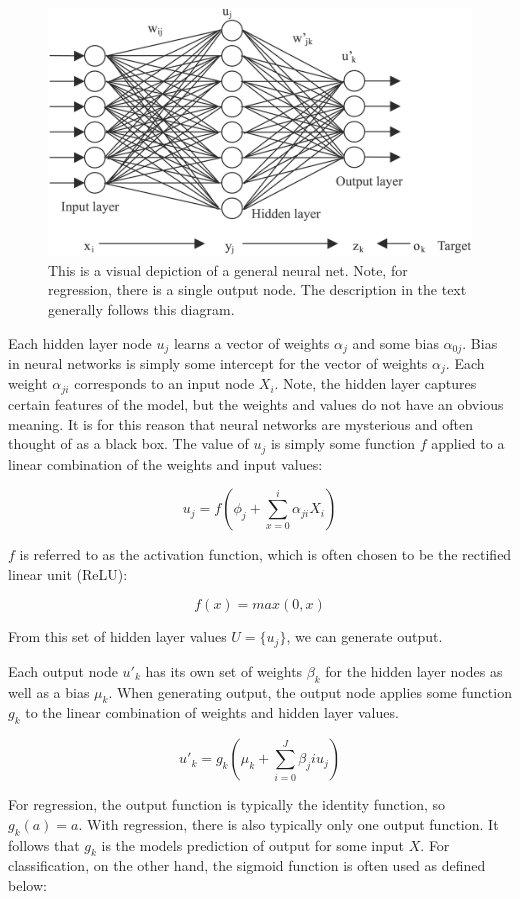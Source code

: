 \documentclass[12pt]{article}
\begin{document}
\begin{figure}[ht]
	\centering
	\includegraphics[width=.85\textwidth]{NeuralNetwork.png}
	\caption{This is a visual depiction of a general neural net. Note, for regression, there is a single output node. The description in the text generally follows this diagram. \cite{neural}}
	\label{neuralnet}
\end{figure}

Each hidden layer node $u_j$ learns a vector of weights $\alpha_j$ and some bias $\alpha_{0j}$. Bias in neural networks is simply some intercept for the vector of weights $\alpha_j$. Each weight $\alpha_{ji}$ corresponds to an input node $X_i$. Note, the hidden layer captures certain features of the model, but the weights and values do not have an obvious meaning. It is for this reason that neural networks are mysterious and often thought of as a black box. The value of $u_j$ is simply some function $f$ applied to a linear combination of the weights and input values:

$$u_j = f(\phi_{j} + \sum_{x=0}^{i}\alpha_{ji} X_i)$$

$f$ is referred to as the activation function, which is often chosen to be the rectified linear unit (ReLU):

$$f(x) = max(0,x)$$


From this set of hidden layer values $U = \{u_j\}$, we can generate output.

Each output node $u'_k$ has its own set of weights $\beta_k$ for the hidden layer nodes as well as a bias $\mu_k$. 
When generating output, the output node applies some function $g_k$ to the linear combination of weights and hidden layer values.

$$u'_k = g_k( \mu_k + \sum_{i=0}^{J} \beta_ji u_j)$$

For regression, the output function is typically the identity function, so $g_k(a) = a$. With regression, there is also typically only one output function. It follows that $g_k$ is the models prediction of output for some input $X$.\cite[350-351]{springer} For classification, on the other hand, the sigmoid function is often used as defined below:
\end{document}
